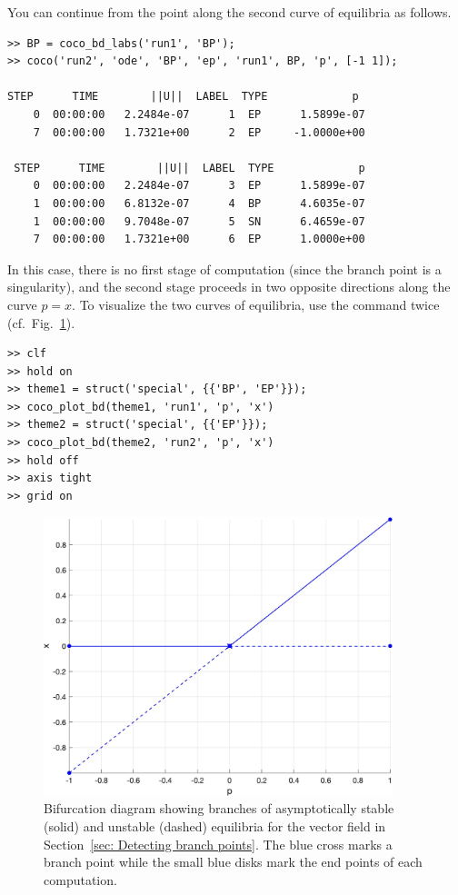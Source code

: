 You can continue from the  point along the second curve of equilibria as follows.
\begin{lstlisting}[language=coco-highlight,frame=lines]
>> BP = coco_bd_labs('run1', 'BP');
>> coco('run2', 'ode', 'BP', 'ep', 'run1', BP, 'p', [-1 1]);

STEP      TIME        ||U||  LABEL  TYPE             p
    0  00:00:00   2.2484e-07      1  EP      1.5899e-07
    7  00:00:00   1.7321e+00      2  EP     -1.0000e+00

 STEP      TIME        ||U||  LABEL  TYPE             p
    0  00:00:00   2.2484e-07      3  EP      1.5899e-07
    1  00:00:00   6.8132e-07      4  BP      4.6035e-07
    1  00:00:00   9.7048e-07      5  SN      6.4659e-07
    7  00:00:00   1.7321e+00      6  EP      1.0000e+00
\end{lstlisting}
In this case, there is no first stage of computation (since the branch point is a singularity), and the second stage proceeds in two opposite directions along the curve $p=x$. To visualize the two curves of equilibria, use the  command twice (cf.\ Fig.~\ref{fig: Section3_2_1}).
\begin{lstlisting}[language=coco-highlight,frame=lines]
>> clf
>> hold on
>> theme1 = struct('special', {{'BP', 'EP'}});
>> coco_plot_bd(theme1, 'run1', 'p', 'x')
>> theme2 = struct('special', {{'EP'}});
>> coco_plot_bd(theme2, 'run2', 'p', 'x')
>> hold off
>> axis tight
>> grid on
\end{lstlisting}
\begin{figure}[h]
\centering
\includegraphics[width=4in]{Figures/Section3_2_1.jpg}
\caption{Bifurcation diagram showing branches of asymptotically stable (solid) and unstable (dashed) equilibria for the vector field in Section~\ref{sec: Detecting branch points}. The blue cross marks a branch point while the small blue disks mark the end points of each computation.}
\label{fig: Section3_2_1}
\end{figure}

